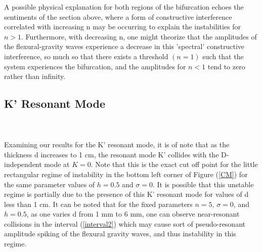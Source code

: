 \documentclass{article}
\begin{document}
A possible physical explanation for both regions of the bifurcation echoes the sentiments of the section above, where a form of constructive interference correlated with increasing n may be occurring to explain the instabilities for \(n>1\). Furthermore, with decreasing n, one might theorize that the amplitudes of the flexural-gravity waves experience a decrease in this 'spectral' constructive interference, so much so that there exists a threshold \((n = 1)\) such that the system experiences the bifurcation, and the amplitudes for \(n < 1\) tend to zero rather than infinity. 
\\


\subsection{K' Resonant Mode}
\\
\\
Examining our results for the K' resonant mode, it is of note that as the thickness d increases to 1 cm, the resonant mode K' collides with the D-independent mode at \(K = 0\). Note that this is the exact cut off point for the little rectangular regime of instability in the bottom left corner of Figure (\ref{CM}) for the same parameter values of \(h = 0.5\) and \(\sigma = 0\). It is possible that this unstable regime is partially due to the presence of this K' resonant mode for values of d less than 1 cm. It can be noted that for the fixed parameters \( n = 5\), \(\sigma = 0\), and \(h = 0.5\), as one varies d from 1 mm to 6 mm, one can observe near-resonant collisions in the interval (\ref{interval2}) which may cause sort of pseudo-resonant amplitude spiking of the flexural gravity waves, and thus instability in this regime. 

\\
\\
\end{document}
